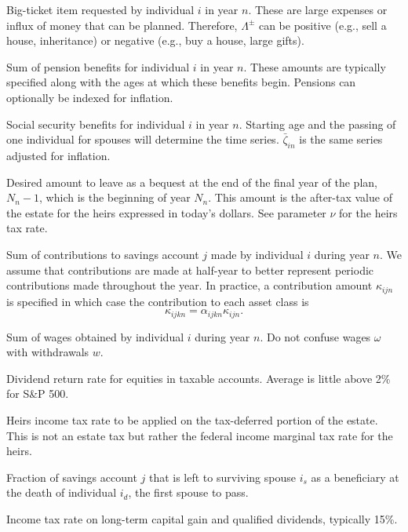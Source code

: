 \documentclass{report}[fleqn,12pt]
\begin{document}
\begin{description}[leftmargin=4em,style=multiline]
\item [$\Lambda^\pm_{in}$]
	Big-ticket item requested by individual $i$ in year $n$.
	These are large expenses or influx of money
	that can be planned. Therefore, $\Lambda^\pm$ can be positive
	(e.g., sell a house, inheritance) or negative (e.g., buy a house, large gifts).
\item [$\pi_{in}$]
	Sum of pension benefits for individual $i$ in year $n$. These amounts are typically
	specified along with the ages at which these benefits begin. Pensions
	can optionally be indexed for inflation.
\item [$\zeta_{in}$]
	Social security benefits for individual $i$ in year $n$. Starting age and the passing
	of one individual for spouses will determine the time series. $\bar{\zeta}_{in}$ is
	the same series adjusted for inflation.
\item [$\epsilon_{N_n}$]
	Desired amount to leave as a bequest at the end of the final year of the plan, $N_n-1$,
	which is the beginning of year $N_n$. This amount is the after-tax value of the estate
	for the heirs expressed in today's dollars. See parameter $\nu$ for the heirs tax rate.
\item [$\kappa_{ijn}$]
	Sum of contributions to savings account $j$ made by individual $i$ during year $n$.
	We assume that contributions are made at half-year to better represent periodic
        contributions made throughout the year.
	In practice, a contribution
	amount $\kappa_{ijn}$ is specified in which case the contribution to each asset
	class is
	\begin{equation}
		\kappa_{ijkn} = \alpha_{ijkn}\kappa_{ijn}.
	\end{equation}
\item [$\omega_{in}$]
	Sum of wages obtained by individual $i$ during year $n$.
	Do not confuse wages $\omega$ with withdrawals $w$.
\item [$\mu$]
	Dividend return rate for equities in taxable accounts. Average is little above 2\% for S\&P 500.
\item [$\nu$]
	Heirs income tax rate to be applied on the tax-deferred portion of the estate. This is not an estate tax
	but rather the federal income marginal tax rate for the heirs.
\item [$\phi_j$]
	Fraction of savings account $j$ that is left to surviving spouse $i_s$ as a beneficiary
	at the death of individual $i_d$, the first spouse to pass.
\item [$\psi$]
	Income tax rate on long-term capital gain and qualified dividends, typically 15\%.

\end{description}
\end{document}
